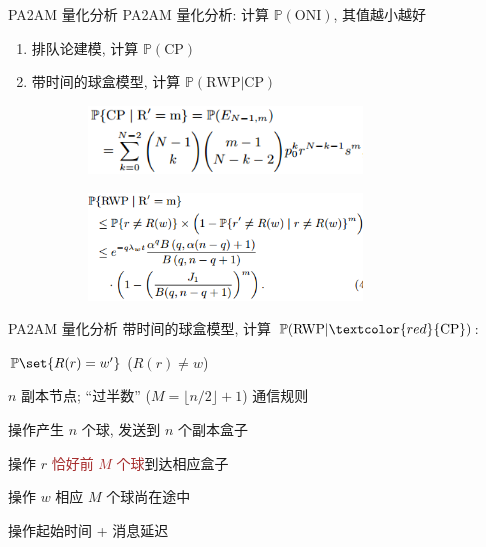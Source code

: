 \begin{frame}{PA2AM 量化分析}
  PA2AM 量化分析: 计算 $\mathbb{P}(\textrm{ONI})$, 其值越小越好

  \begin{enumerate}
	\setlength{\itemsep}{3pt}
	\item 排队论建模, 计算 $\mathbb{P}(\textrm{CP})$ 
	\item 带时间的球盒模型, 计算 $\mathbb{P}(\textrm{RWP|CP})$
  \end{enumerate}
  
  \vspace{0.30cm}

  \begin{figure}
	\begin{subfigure}{0.50\textwidth}
	  \centering
	  \includegraphics[width = 0.80\textwidth]{figs/cp.png}
	\end{subfigure}%
	\begin{subfigure}{0.50\textwidth}
	  \centering
	  \includegraphics[width = 0.80\textwidth]{figs/rwp.png}
	\end{subfigure}
  \end{figure}
\end{frame}
\begin{frame}{PA2AM 量化分析}
  带时间的球盒模型, 计算 $\mathbb{P}(\textrm{RWP}|\textcolor{red}{\textrm{CP}})$:
	\begin{description}
	  \item<3->[建模目的:] $\mathbb{P}\set{R(r) = w'}$ ($R(r) \neq w$)
	  \item<4->[系统协议:] $n$ 副本节点; ``过半数'' {\small ($M = \lfloor n / 2 \rfloor + 1$)} 通信规则
	  \item<5->[球盒模型:] 操作产生 $n$ 个球, 发送到 $n$ 个副本盒子
	  \item<6->[时刻$t$:] 操作 $r$ \textcolor{brown}{恰好前 $M$ 个球}到达相应盒子
	  \item<7->[$R(r) \neq w$:] 操作 $w$ 相应 $M$ 个球尚在途中 
	  \item<8->[带时间:] 操作起始时间 + 消息延迟
	\end{description}

  \begin{figure}[h!]
    \centering
    \begin{adjustbox}{max totalsize = {0.50\textwidth}{1.00\textheight}, center}
      
    \end{adjustbox}
  \end{figure}
\end{frame}
